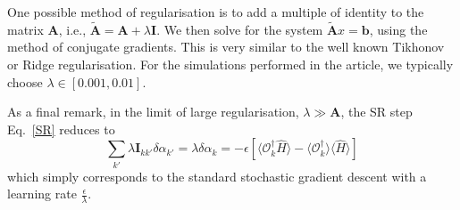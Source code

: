 \documentclass[aps,prl,twocolumn,amsmath,amssymb,superscriptaddress,floatfix]{revtex4-1}
\begin{document}
\begin{widetext}
One possible method of regularisation is to add a multiple of identity to the matrix $\boldsymbol{A}$, i.e., $\boldsymbol{\widetilde{A}} = \boldsymbol{A} + \lambda \boldsymbol{I}$. We then solve for the system $\boldsymbol{\widetilde{A}} x = \boldsymbol{b}$, using the method of conjugate gradients. This is very similar to the well known Tikhonov or Ridge regularisation. For the simulations performed in the article, we typically choose $\lambda \in [0.001,0.01]$.

As a final remark, in the limit of large regularisation, $\lambda \gg \boldsymbol{A}$, the SR step Eq.~\eqref{SR} reduces to
\begin{equation}
\sum_{k'} \lambda \boldsymbol{I}_{kk'} \delta\alpha_{k'} =\lambda \delta\alpha_{k } = -\epsilon \left[ \langle\mathcal{O}_{k}^{\dagger} \hat{H}\rangle -  \langle\mathcal{O}_{k}^{\dagger}\rangle \langle\hat{H}\rangle \right]
\end{equation}
which simply corresponds to the standard stochastic gradient descent with a learning rate $\frac{\epsilon}{\lambda}$.



\end{widetext}
\end{document}
